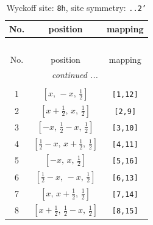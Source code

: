 \documentclass[fleqn,8pt]{jsarticle}
\begin{document}
\begin{longtable}{ccc}
\caption{Wyckoff site: {\tt 8h}, site symmetry: {\tt ..2'}}
 \\
 \hline \hline
No. & position & mapping \\ \hline \endfirsthead

\multicolumn{2}{l}{\tablename\ \thetable{}} \\
 \hline \hline
No. & position & mapping \\ \hline \endhead

 \hline \hline
\multicolumn{2}{r}{\footnotesize\it continued ...} \\ \endfoot

 \hline \hline
\multicolumn{2}{r}{} \\ \endlastfoot

1 & $\left[ x,\, - x,\, \frac{1}{2} \right]$ & {\tt [1,12]} \\ \hline
2 & $\left[ x + \frac{1}{2},\, x,\, \frac{1}{2} \right]$ & {\tt [2,9]} \\ \hline
3 & $\left[ - x,\, \frac{1}{2} - x,\, \frac{1}{2} \right]$ & {\tt [3,10]} \\ \hline
4 & $\left[ \frac{1}{2} - x,\, x + \frac{1}{2},\, \frac{1}{2} \right]$ & {\tt [4,11]} \\ \hline
5 & $\left[ - x,\, x,\, \frac{1}{2} \right]$ & {\tt [5,16]} \\ \hline
6 & $\left[ \frac{1}{2} - x,\, - x,\, \frac{1}{2} \right]$ & {\tt [6,13]} \\ \hline
7 & $\left[ x,\, x + \frac{1}{2},\, \frac{1}{2} \right]$ & {\tt [7,14]} \\ \hline
8 & $\left[ x + \frac{1}{2},\, \frac{1}{2} - x,\, \frac{1}{2} \right]$ & {\tt [8,15]} \\
\end{longtable}
\renewcommand{\arraystretch}{1.2}
\end{document}
